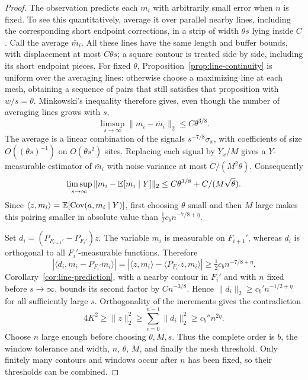 \begin{proof}
The observation predicts each $m_i$ with arbitrarily small error when
$n$ is fixed.  To see this quantitatively, average it over parallel
nearby lines, including the corresponding short endpoint corrections,
in a strip of width $\theta s$ lying inside $C$.  Call the average
$\bar m_i$.  All these lines have the same length and buffer bounds,
with displacement at most $C\theta s$; a square contour is treated
side by side, including its short endpoint pieces.  For fixed $\theta$,
Proposition~\ref{prop:line-continuity} is uniform over the averaging
lines: otherwise choose a maximizing line at each mesh, obtaining a
sequence of pairs that still satisfies that proposition with
$w/s=\theta$.  Minkowski's inequality therefore gives, even though
the number of averaging lines grows with $s$,
\[
 \limsup_{s\to\infty}\|m_i-\bar m_i\|_2\leq C\theta^{3/8}.
\]
The average is a linear combination of the signals
$s^{-7/8}\sigma_x$, with coefficients of size $O((\theta s)^{-1})$
on $O(\theta s^2)$ sites.  Replacing each signal by $Y_x/M$ gives a
$Y$-measurable estimator of $\bar m_i$ with noise variance at most
$C/(M^2\theta)$.  Consequently
\[
 \limsup_{s\to\infty}\|m_i-\mathbb E[m_i\mid Y]\|_2
 \leq C\theta^{3/8}+C/(M\sqrt\theta).
\]
Since
$\langle z,m_i\rangle=\mathbb E[\operatorname{Cov}(a,m_i\mid Y)]$, first choosing
$\theta$ small and then $M$ large makes this pairing smaller in absolute
value than $\tfrac12c_b n^{-7/8+\eta}$.

Set $d_i=(P_{F_{i+1}'}-P_{F_i'})z$.  The variable $m_i$ is measurable
on $F_{i+1}'$, whereas $d_i$ is orthogonal to all $F_i'$-measurable
functions.  Therefore
\[
 |\langle d_i,m_i-P_{F_i'}m_i\rangle|
 =|\langle z,m_i\rangle-\langle P_{F_i'}z,m_i\rangle|
 \geq\tfrac12c_b n^{-7/8+\eta}.
\]
Corollary~\ref{cor:line-prediction}, with a nearby contour in $F_i'$
and with $n$ fixed before $s\to\infty$, bounds its second factor by
$Cn^{-3/8}$.  Hence $\|d_i\|_2\geq c_b'n^{-1/2+\eta}$ for all
sufficiently large $s$.  Orthogonality of the increments gives the
contradiction
\begin{equation}
 4K^2\geq\|z\|_2^2\geq\sum_{i=0}^{n-1}\|d_i\|_2^2
             \geq c_b''n^{2\eta}.
 \label{eq:transfer-contradiction}
\end{equation}
Choose $n$ large enough before choosing $\theta,M,s$.  Thus the complete
order is $b$, the window tolerance and width, $n$, $\theta$, $M$, and
finally the mesh threshold.  Only finitely many contours and windows
occur after $n$ has been fixed, so their thresholds can be combined.
\end{proof}

